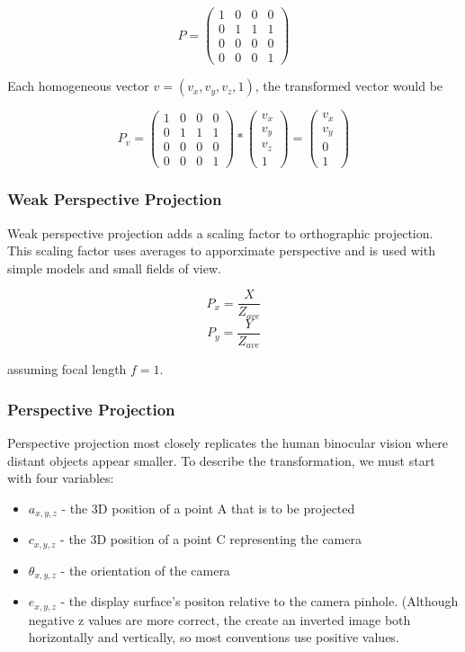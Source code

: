 \documentclass{article}
\begin{document}
\[ P = \begin{pmatrix}
  1 & 0 & 0 & 0 \\
  0 & 1 & 1 & 1 \\
  0 & 0 & 0 & 0 \\
  0 & 0 & 0 & 1 
 \end{pmatrix}\]	

Each homogeneous vector $v = (v_x, v_y, v_z, 1)$, the transformed vector would be

\[P_{v} = \begin{pmatrix}
  1 & 0 & 0 & 0 \\
  0 & 1 & 1 & 1 \\
  0 & 0 & 0 & 0 \\
  0 & 0 & 0 & 1 
 \end{pmatrix}	
*
\begin{pmatrix}
  v_{x} \\
  v_{y} \\
  v_{z} \\
  1
 \end{pmatrix}	
=
\begin{pmatrix}
  v_{x} \\
  v_{y} \\
  0 \\
  1
 \end{pmatrix}\]

\subsubsection{Weak Perspective Projection}
Weak perspective projection adds a scaling factor to orthographic projection. This scaling factor uses averages to apporximate perspective and is used with simple models and small fields of view.

  \[P_{x} =  \frac{X}{Z_{ave}}\]
  \[P_{y} =  \frac{Y}{Z_{ave}}\]

assuming focal length $f = 1$.

\subsubsection{Perspective Projection}
Perspective projection most closely replicates the human binocular vision where distant objects appear smaller. To describe the transformation, we must start with four variables:

\begin{itemize}
  \item $a_{x, y, z}$ - the 3D position of a point A that is to be projected
  \item $c_{x, y, z}$ - the 3D position of a point C representing the camera
  \item $\theta_{x, y, z}$ - the orientation of the camera
  \item $e_{x, y, z}$ - the display surface's positon relative to the camera pinhole. (Although negative z values are more correct, the create an inverted image both horizontally and vertically, so most conventions use positive values.
\end{itemize}
\end{document}
